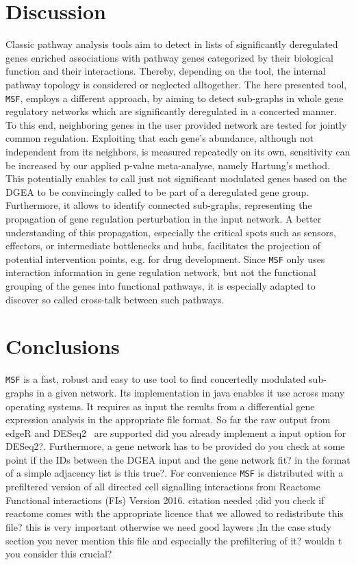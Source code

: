\documentclass[10pt,a4paper,twocolumn]{article}
\newcommand{\TODO}[1]{\begingroup\color{red}#1\endgroup}
\begin{document}
\section*{Discussion}

Classic pathway analysis tools aim to detect in lists of significantly
deregulated genes enriched associations with pathway genes categorized
by their biological function and their interactions. Thereby,
depending on the tool, the internal pathway topology is considered or
neglected alltogether. The here presented tool, \texttt{MSF}, employs
a different approach, by aiming to detect sub-graphs in whole gene
regulatory networks which are significantly deregulated in a concerted
manner. To this end, neighboring genes in the user provided network
are tested for jointly common regulation. Exploiting that each gene's
abundance, although not independent from its neighbors, is measured
repeatedly on its own, sensitivity can be increased by our applied
p-value meta-analyse, namely Hartung's method. This potentially
enables to call just not significant modulated genes based on the DGEA
to be convincingly called to be part of a deregulated gene group.
Furthermore, it allows to identify connected sub-graphs, representing
the propagation of gene regulation perturbation in the input
network. A better understanding of this propagation, especially the
critical spots such as sensors, effectors, or intermediate bottlenecks
and hubs, facilitates the projection of potential intervention points,
e.g. for drug development. Since \texttt{MSF} only uses interaction
information in gene regulation network, but not the functional
grouping of the genes into functional pathways, it is especially
adapted to discover so called cross-talk between such pathways.


\section*{Conclusions}

\texttt{MSF} is a fast, robust and easy to use tool to find
concertedly modulated sub-graphs in a given network. Its
implementation in java enables it use across many operating
systems. It requires as input the results from a differential gene
expression analysis in the appropriate file format. So far the raw
output from edgeR and DESeq2~\cite{love2014moderated} are supported
\TODO{did you already implement a input option for
  DESeq2?}. Furthermore, a gene network has to be provided \TODO{do
  you check at some point if the IDs between the DGEA input and the
  gene network fit?} in the format of a simple adjacency list \TODO{is
  this true?}. For convenience \texttt{MSF} is distributed with a
prefiltered version of all directed cell signalling interactions from
Reactome Functional interactions (FIs) Version 2016. \TODO{citation
  needed} ;\TODO{did you check if reactome comes with the appropriate
  licence that we allowed to redistribute this file? this is very
  important otherwise we need good laywers} ;\TODO{In the case study
  section you never mention this file and especially the prefiltering
  of it? wouldn t you consider this crucial?}
\end{document}
